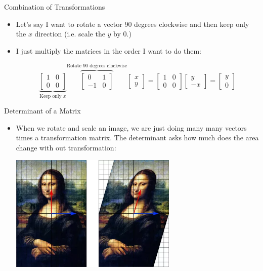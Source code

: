 \documentclass[aspectratio=43]{beamer}
\begin{document}
\begin{frame}{Combination of Transformations}
  \begin{itemize}
    \item Let's say I want to rotate a vector 90 degrees clockwise and then keep only the $x$ direction (i.e. scale the $y$ by $0$.)

    \item I just multiply the matrices in the order I want to do them:

          $$
            \underbrace{\begin{bmatrix} 1 & 0 \\ 0 & 0 \end{bmatrix}}_{\text{Keep only } x} \overbrace{\begin{bmatrix} 0 & 1 \\ -1 & 0 \end{bmatrix}}^{\text{Rotate 90 degrees clockwise}} \begin{bmatrix} x \\ y \end{bmatrix} = \begin{bmatrix} 1 & 0 \\ 0 & 0 \end{bmatrix} \begin{bmatrix} y \\ -x \end{bmatrix} = \begin{bmatrix} y \\ 0 \end{bmatrix}
          $$
  \end{itemize}
\end{frame}

\begin{frame}{Determinant of a Matrix}
  \begin{itemize}
    \item When we rotate and scale an image, we are just doing many many vectors times a transformation matrix. The determinant asks how much does the area change with out transformation:

          \vspace{5mm}
          \begin{center}
            \includegraphics[width= 80mm]{determinant.png}
          \end{center}
  \end{itemize}
\end{frame}
\end{document}
